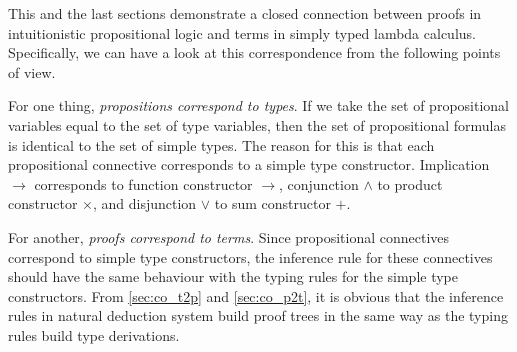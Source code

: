 This and the last sections demonstrate a closed connection between proofs in intuitionistic propositional logic and terms in simply typed lambda calculus. Specifically, we can have a look at this correspondence from the following points of view.

For one thing, \emph{propositions correspond to types}. If we take the set of propositional variables equal to the set of type variables, then the set of propositional formulas is identical to the set of simple types. The reason for this is that each propositional connective corresponds to a simple type constructor. Implication $ \to $ corresponds to function constructor $ \to $, conjunction $ \land $ to product constructor $ \times $, and disjunction $ \lor $ to sum constructor $ + $.

For another, \emph{proofs correspond to terms}. Since propositional connectives correspond to simple type constructors, the inference rule for these connectives should have the same behaviour with the typing rules for the simple type constructors. From \ref{sec:co_t2p} and \ref{sec:co_p2t}, it is obvious that the inference rules in natural deduction system build proof trees in the same way as the typing rules build type derivations.